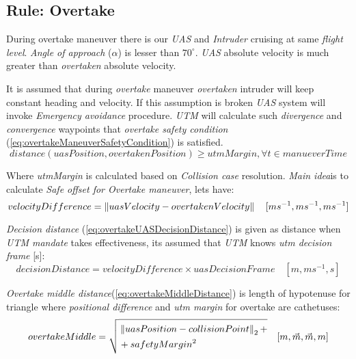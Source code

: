 \subsection{Rule: Overtake}\label{sec:ruleOvertake}
\noindent During overtake maneuver there is our \emph{UAS} and \emph{Intruder} cruising at same \emph{flight level}. \emph{Angle of approach} ($\alpha$) is lesser than $70^\circ$. \emph{UAS} absolute velocity is much greater than \emph{overtaken} absolute velocity. 

It is assumed that during \emph{overtake} maneuver \emph{overtaken} intruder will keep constant heading and velocity. If this assumption is broken \emph{UAS} system will invoke \emph{Emergency avoidance} procedure. \emph{UTM} will calculate such \emph{divergence} and \emph{convergence} waypoints that \emph{overtake safety condition} (\ref{eq:overtakeManeuverSafetyCondition}) is satisfied.
\begin{equation}\label{eq:overtakeManeuverSafetyCondition}
        distance(uasPosition,overtakenPosition) \ge utmMargin, \forall t\in manueverTime
\end{equation}

\noindent Where \emph{utmMargin} is calculated based on \emph{Collision case} resolution. \emph{Main idea}is to calculate \emph{Safe offset for Overtake maneuver}, lets have:
\begin{equation}\label{eq:overtakeVelocityDifference}
    velocityDifference=\left\lVert uasVelocity-overtakenVelocity\right\rVert\quad [ms^{-1},ms^{-1},ms^{-1}]
\end{equation}

\noindent \emph{Decision distance} (\ref{eq:overtakeUASDecisionDistance}) is given as distance when \emph{UTM mandate} takes effectiveness, its assumed that \emph{UTM} knows \emph{utm decision frame} [s]:
\begin{equation}\label{eq:overtakeUASDecisionDistance}
    decisionDistance =  velocityDifference \times uasDecisionFrame\quad [m,ms^{-1},s]    
\end{equation}

\noindent \emph{Overtake middle distance}(\ref{eq:overtakeMiddleDistance}) is length of hypotenuse for triangle where \emph{positional difference} and \emph{utm margin} for overtake are cathetuses:
\begin{equation}\label{eq:overtakeMiddleDistance}
    overtakeMiddle=\sqrt{\begin{aligned}&\left\lVert uasPosition - collisionPoint\right\rVert_2+\\ &+ safetyMargin^2 \end{aligned}}\quad [m,\vec{m},\vec{m},m]
\end{equation}

